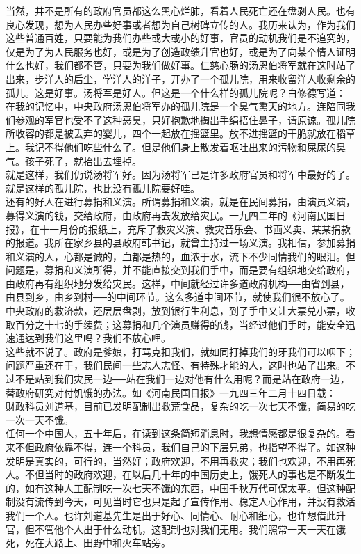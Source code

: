当然，并不是所有的政府官员都这么黑心烂肺，看着人民死亡还在盘剥人民。也有良心发现，想为人民办些好事或者想为自己树碑立传的人。我历来认为，作为我们这些普通百姓，只要能为我们办些或大或小的好事，官员的动机我们是不追究的，仅是为了为人民服务也好，或是为了创造政绩升官也好，或是为了向某个情人证明什么也好，我们都不管，只要为我们做好事。仁慈心肠的汤恩伯将军就在这时站了出来，步洋人的后尘，学洋人的洋子，开办了一个孤儿院，用来收留洋人收剩余的孤儿。这是好事。汤将军是好人。但这是一个什么样的孤儿院呢？白修德写道：\\

在我的记忆中，中央政府汤恩伯将军办的孤儿院是一个臭气熏天的地方。连陪同我们参观的军官也受不了这种恶臭，只好抱歉地掏出手绢捂住鼻子，请原谅。孤儿院所收容的都是被丢弃的婴儿，四个一起放在摇篮里。放不进摇篮的干脆就放在稻草上。我记不得他们吃些什么了。但是他们身上散发着呕吐出来的污物和屎尿的臭气。孩子死了，就抬出去埋掉。\\

就是这样，我们仍说汤将军好。因为汤将军已是许多政府官员和将军中最好的了。就是这样的孤儿院，也比没有孤儿院要好哇。\\

还有的好人在进行募捐和义演。所谓募捐和义演，就是在民间募捐，由演员义演，募得义演的钱，交给政府，由政府再去发放给灾民。一九四二年的《河南民国日报》，在十一月份的报纸上，充斥了救灾义演、救灾音乐会、书画义卖、某某捐款的报道。我所在家乡县的县政府韩书记，就曾主持过一场义演。我相信，参加募捐和义演的人，心都是诚的，血都是热的，血浓于水，流下不少同情我们的眼泪。但问题是，募捐和义演所得，并不能直接交到我们手中，而是要有组织地交给政府，由政府再有组织地分发给灾民。这样，中间就经过许多道政府机构{\Add ──}由省到县，由县到乡，由乡到村{\Add ──}的中间环节。这么多道中间环节，就使我们很不放心了。中央政府的救济款，还层层盘剥，放到银行生利息，到了手中又让大票兑小票，收取百分之十七的手续费；这募捐和几个演员赚得的钱，当经过他们手时，能安全迅速通达到我们这里吗？我们不放心哩。\\

这些就不说了。政府是爹娘，打骂克扣我们，就如同打掉我们的牙我们可以咽下；问题严重还在于，我们民间一些志人志怪、有特殊才能的人，这时也站了出来。不过不是站到我们灾民一边{\Add ──}站在我们一边对他有什么用呢？而是站在政府一边，替政府研究对付饥饿的办法。如《河南民国日报》一九四三年二月十四日载：\\

财政科员刘道基，目前已发明配制出救荒食品，复杂的吃一次七天不饿，简易的吃一次一天不饿。\\

任何一个中国人，五十年后，在读到这条简短消息时，我想情感都是很复杂的。看来不但政府依靠不得，连一个科员，我们自己的下层兄弟，也指望不得了。如这种发明是真实的，可行的，当然好；政府欢迎，不用再救灾；我们也欢迎，不用再死人。不但当时的政府欢迎，在以后几十年的中国历史上，饿死人的事也是不断发生的，如有这种人工配制吃一次七天不饿的东西，中国千秋万代可保太平。但这种配制没有流传到今天，可见当时它也只是起了宣传作用、稳定人心作用，并没有救活我们一个人。也许刘道基先生是出于好心、同情心、耐心和细心，也许想借此升官，但不管他个人出于什么动机，这配制也对我们无用。我们照常一天一天在饿死，死在大路上、田野中和火车站旁。\\

